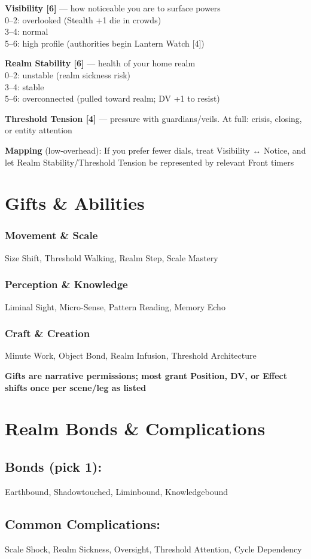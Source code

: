 \documentclass[11pt,letterpaper]{article}
\newcommand{\thresholdtrack}[2]{\textbf{#1 [#2]}}
\newcommand{\giftcategory}[1]{\subsubsection*{#1}}
\begin{document}
\thresholdtrack{Visibility}{6} --- how noticeable you are to surface powers \\
0--2: overlooked (Stealth +1 die in crowds) \\
3--4: normal \\
5--6: high profile (authorities begin Lantern Watch [4])

\thresholdtrack{Realm Stability}{6} --- health of your home realm \\
0--2: unstable (realm sickness risk) \\
3--4: stable \\
5--6: overconnected (pulled toward realm; DV +1 to resist)

\thresholdtrack{Threshold Tension}{4} --- pressure with guardians/veils. At full: crisis, closing, or entity attention

\textbf{Mapping} (low-overhead): If you prefer fewer dials, treat Visibility ↔ Notice, and let Realm Stability/Threshold Tension be represented by relevant Front timers

\section{Gifts \& Abilities}

\giftcategory{Movement \& Scale}
Size Shift, Threshold Walking, Realm Step, Scale Mastery

\giftcategory{Perception \& Knowledge}
Liminal Sight, Micro-Sense, Pattern Reading, Memory Echo

\giftcategory{Craft \& Creation}
Minute Work, Object Bond, Realm Infusion, Threshold Architecture

\textbf{Gifts are narrative permissions; most grant Position, DV, or Effect shifts once per scene/leg as listed}

\section{Realm Bonds \& Complications}

\subsection*{Bonds (pick 1):}
Earthbound, Shadowtouched, Liminbound, Knowledgebound

\subsection*{Common Complications:}
Scale Shock, Realm Sickness, Oversight, Threshold Attention, Cycle Dependency
\end{document}
